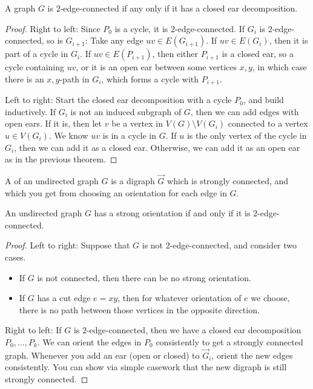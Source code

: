 \begin{theorem}
  A graph $G$ is $2$-edge-connected if any only if it has a closed ear decomposition.
\end{theorem}

\begin{proof}
  Right to left:
  Since $P_0$ is a cycle, it is $2$-edge-connected.
  If $G_i$ is $2$-edge-connected, so is $G_{i+1}$:
  Take any edge $uv \in E(G_{i+1})$.
  If $uv \in E(G_i)$, then it is part of a cycle in $G_i$.
  If $uv \in E(P_{i+1})$, then either $P_{i+1}$ is a closed ear, so a cycle
  containing $uv$, or it is an open ear between some vertices $x,y$, in which
  case there is an $x,y$-path in $G_i$, which forms a cycle with $P_{i+1}$.

  Left to right:
  Start the closed ear decomposition with a cycle $P_0$, and build inductively.
  If $G_i$ is not an induced subgraph of $G$, then we can add edges with open
  ears.
  If it is, then let $v$ be a vertex in $V(G) \setminus V(G_i)$ connected to a
  vertex $u \in V(G_i)$.
  We know $uv$ is in a cycle in $G$.
  If $u$ is the only vertex of the cycle in $G_i$, then we can add it as a
  closed ear.
  Otherwise, we can add it as an open ear as in the previous theorem.
\end{proof}

\begin{definition}
  A  of an undirected graph $G$ is a digraph $\vec{G}$
  which is strongly connected, and which you get from choosing an orientation
  for each edge in $G$.
\end{definition}

\begin{theorem}[Robbins]
  An undirected graph $G$ has a strong orientation if and only if it is
  $2$-edge-connected.
\end{theorem}

\begin{proof}
  Left to right:
  Suppose that $G$ is not $2$-edge-connected, and consider two cases.
  \begin{itemize}
  \item If $G$ is not connected, then there can be no strong orientation.
  \item If $G$ has a cut edge $e = xy$, then for whatever orientation of $e$ we
	choose, there is no path between those vertices in the opposite direction.
  \end{itemize}

  Right to left:
  If $G$ is $2$-edge-connected, then we have a closed ear decomposition $P_0,
  \ldots, P_k$.
  We can orient the edges in $P_0$ consistently to get a strongly connected
  graph.
  Whenever you add an ear (open or closed) to $\vec{G}_i$, orient the new edges
  consistently.
  You can show via simple casework that the new digraph is still strongly
  connected.
\end{proof}

